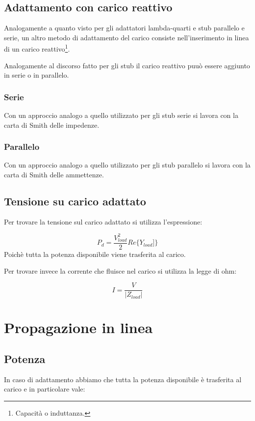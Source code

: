 \documentclass[10pt,a4paper]{report}
\begin{document}
	\section{Adattamento con carico reattivo}

		Analogamente a quanto visto per gli adattatori lambda-quarti e stub parallelo e serie, un altro metodo di adattamento del carico consiste nell'inserimento in linea di un carico reattivo\footnote{Capacità o induttanza.}.

		Analogamente al discorso fatto per gli stub il carico reattivo puuò essere aggiunto in serie o in parallelo.

		\subsection{Serie}
			Con un approccio analogo a quello utilizzato per gli stub serie si lavora con la carta di Smith delle impedenze.
		\subsection{Parallelo}
					Con un approccio analogo a quello utilizzato per gli stub parallelo si lavora con la carta di Smith delle ammettenze.

	\section{Tensione su carico adattato}

	Per trovare la tensione sul carico adattato si utilizza l'espressione:

	\begin{equation}
	P_d= \frac {V_{load}^2}{2} Re\{ Y_{load}] \}
	\end{equation}
	Poichè tutta la potenza disponibile viene trasferita al carico.

	Per trovare invece la corrente che fluisce nel carico si utilizza la legge di ohm:

	\begin{equation}
	I=\frac{V}{|Z_{load}|}
	\end{equation}

\chapter{Propagazione in linea}



	\section{Potenza}
		In caso di adattamento abbiamo che tutta la potenza disponibile è trasferita al carico e in particolare vale:
			
\end{document}
